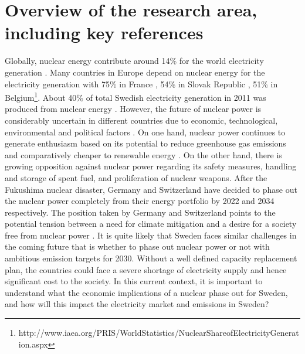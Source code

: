 \section{Overview of the research area, including key references}
Globally, nuclear energy contribute around 14\% for the world electricity generation \citep{OECD2012}. Many countries in Europe depend on nuclear energy for the electricity generation with 75\% in France , 54\% in Slovak Republic , 51\% in Belgium\footnote{http://www.iaea.org/PRIS/WorldStatistics/NuclearShareofElectricityGeneration.aspx}. About 40\% of total Swedish electricity generation in 2011 was produced from nuclear energy \citep{SEA2012}. However, the future of nuclear power is considerably uncertain in different countries due to economic, technological, environmental and political factors \citep{Joskow2012}. On one hand, nuclear power continues to generate enthusiasm based on its potential to reduce greenhouse gas emissions and comparatively cheaper to renewable energy \citep{Davis2012, Renssen2013}. On the other hand, there is growing opposition against nuclear power regarding its safety measures, handling and storage of spent fuel, and proliferation of nuclear weapons. After the Fukushima nuclear disaster, Germany and Switzerland have decided to phase out the nuclear power completely from their energy portfolio by  2022 and 2034 respectively. The position taken by Germany and Switzerland points to the potential tension between a need for climate mitigation and a desire for a society free from nuclear power \citep{Glomsrod2013}. It is quite likely that Sweden faces similar challenges in the coming future that is whether to phase out nuclear power or not with ambitious emission targets for 2030. Without a well defined capacity replacement plan, the countries could face a severe shortage of electricity supply and hence significant cost to the society. In this current context, it is important to understand what the economic implications of a nuclear phase out for Sweden, and how will this impact the electricity market and emissions in Sweden?

